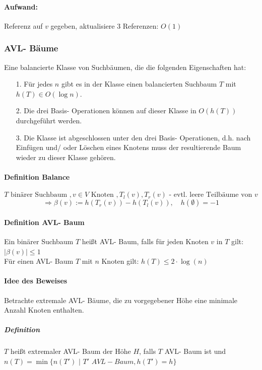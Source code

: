 \documentclass[fleqn]{scrartcl}
\begin{document}
\paragraph*{Aufwand:} Referenz auf $v$ gegeben, aktualisiere 3 Referenzen: $O(1)$

\subsubsection{AVL- Bäume}
Eine balancierte Klasse von Suchbäumen, die die folgenden Eigenschaften hat:
\begin{itemize}
\item[1.] Für jedes $n$ gibt es in der Klasse einen balancierten Suchbaum $T$ mit $h(T) \in O(\log n)$.
\item[2.] Die drei Basis- Operationen können auf dieser Klasse in $O(h(T))$ durchgeführt werden.
\item[3.] Die Klasse ist abgeschlossen unter den drei Basis- Operationen, d.h. nach Einfügen und/ oder Löschen eines Knotens muss der resultierende Baum wieder zu dieser Klasse gehören.
\end{itemize}

\paragraph{Definition Balance}
\[T \text{ binärer Suchbaum }, v \in V \text{ Knoten }, T_l(v), T_r(v) \text{ - evtl. leere Teilbäume von } v\]
\[\Rightarrow \beta (v) := h(T_r(v)) - h(T_l(v)), \quad h(\emptyset) = -1\]

\paragraph{Definition AVL- Baum} Ein binärer Suchbaum $T$ heißt AVL- Baum, falls für jeden Knoten $v$ in $T$ gilt:  $|\beta(v)| \leq 1$\\

Für einen AVL- Baum $T$ mit $n$ Knoten gilt: $h(T) \leq 2 \cdot \log(n)$

\paragraph{Idee des Beweises} Betrachte extremale AVL- Bäume, die zu vorgegebener Höhe eine minimale Anzahl Knoten enthalten.

\subparagraph{Definition} $T$ heißt extremaler AVL- Baum der Höhe $H$, falls $T$ AVL- Baum ist und $n(T) = \min\{n(T')\,\,|\,\,T' \,\, AVL- Baum, h(T') = h\}$
\end{document}
